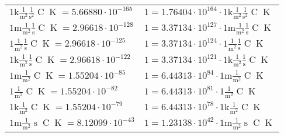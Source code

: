 \begin{center}
\begin{longtable}{l l}
{\color{gray}$1 \bm{\mathrm{ k}}\frac1{\operatorname{m}^2}\frac1{\operatorname{s}^2}{\operatorname{C}}{\operatorname{K}} = 5.66880\cdot10^{-165} $}   & {\color{gray}$ 1 = 1.76404\cdot10^{164} \cdot 1 \bm{\mathrm{ k}}\frac1{\operatorname{m}^2}\frac1{\operatorname{s}^2}{\operatorname{C}}{\operatorname{K}}$}  \\
{\color{gray}$1 \bm{\mathrm{ m}}\frac1{\operatorname{m}^2}\frac1{\operatorname{s}}{\operatorname{C}}{\operatorname{K}} = 2.96618\cdot10^{-128} $}   & {\color{gray}$ 1 = 3.37134\cdot10^{127} \cdot 1 \bm{\mathrm{ m}}\frac1{\operatorname{m}^2}\frac1{\operatorname{s}}{\operatorname{C}}{\operatorname{K}}$}  \\
{\color{black}$1 \bm{\mathrm{ }}\frac1{\operatorname{m}^2}\frac1{\operatorname{s}}{\operatorname{C}}{\operatorname{K}} = 2.96618\cdot10^{-125} $}   & {\color{black}$ 1 = 3.37134\cdot10^{124} \cdot 1 \bm{\mathrm{ }}\frac1{\operatorname{m}^2}\frac1{\operatorname{s}}{\operatorname{C}}{\operatorname{K}}$}  \\
{\color{gray}$1 \bm{\mathrm{ k}}\frac1{\operatorname{m}^2}\frac1{\operatorname{s}}{\operatorname{C}}{\operatorname{K}} = 2.96618\cdot10^{-122} $}   & {\color{gray}$ 1 = 3.37134\cdot10^{121} \cdot 1 \bm{\mathrm{ k}}\frac1{\operatorname{m}^2}\frac1{\operatorname{s}}{\operatorname{C}}{\operatorname{K}}$}  \\
{\color{gray}$1 \bm{\mathrm{ m}}\frac1{\operatorname{m}^2}{}{\operatorname{C}}{\operatorname{K}} = 1.55204\cdot10^{-85} $}   & {\color{gray}$ 1 = 6.44313\cdot10^{84} \cdot 1 \bm{\mathrm{ m}}\frac1{\operatorname{m}^2}{}{\operatorname{C}}{\operatorname{K}}$}  \\
{\color{black}$1 \bm{\mathrm{ }}\frac1{\operatorname{m}^2}{}{\operatorname{C}}{\operatorname{K}} = 1.55204\cdot10^{-82} $}   & {\color{black}$ 1 = 6.44313\cdot10^{81} \cdot 1 \bm{\mathrm{ }}\frac1{\operatorname{m}^2}{}{\operatorname{C}}{\operatorname{K}}$}  \\
{\color{gray}$1 \bm{\mathrm{ k}}\frac1{\operatorname{m}^2}{}{\operatorname{C}}{\operatorname{K}} = 1.55204\cdot10^{-79} $}   & {\color{gray}$ 1 = 6.44313\cdot10^{78} \cdot 1 \bm{\mathrm{ k}}\frac1{\operatorname{m}^2}{}{\operatorname{C}}{\operatorname{K}}$}  \\
{\color{gray}$1 \bm{\mathrm{ m}}\frac1{\operatorname{m}^2}{\operatorname{s}}{\operatorname{C}}{\operatorname{K}} = 8.12099\cdot10^{-43} $}   & {\color{gray}$ 1 = 1.23138\cdot10^{42} \cdot 1 \bm{\mathrm{ m}}\frac1{\operatorname{m}^2}{\operatorname{s}}{\operatorname{C}}{\operatorname{K}}$}  \\

\end{longtable}
\end{center}
